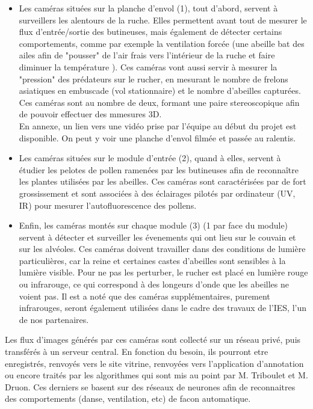 \documentclass[11pt,french,a4paper]{report}
\begin{document}
\begin{itemize}

  \item Les caméras situées sur la planche d'envol (1), tout d'abord, servent à surveillers 
  les alentours de la ruche. Elles permettent avant tout de
  mesurer le flux d'entrée/sortie des butineuses, mais également de détecter
  certains comportements, comme par exemple la ventilation forcée (une abeille
  bat des ailes afin de "pousser" de l'air frais vers l'intérieur de la ruche et faire
  diminuer la température ). Ces caméras vont aussi servir à mesurer la
  "pression" des prédateurs sur le rucher, en mesurant le nombre de frelons
  asiatiques en embuscade (vol stationnaire) et le nombre d'abeilles
  capturées. Ces caméras sont au nombre de deux, formant une paire
  stereoscopique afin de pouvoir effectuer des mmesures 3D. \\
  En annexe, un lien vers une vidéo prise par l'équipe au début du projet est disponible. 
  On peut y voir une planche d'envol filmée et passée au ralentis. \\ 
 
  \item Les caméras situées sur le module d'entrée (2), quand à elles, servent à étudier
  les pelotes de pollen ramenées par les butineuses afin de reconnaître les
  plantes utilisées par les abeilles. Ces caméras sont caractérisées par de
  fort grossissement et sont associées à des éclairages pilotés par ordinateur
  (UV, IR) pour mesurer l'autofluorescence des pollens.

  \item Enfin, les caméras montés sur chaque module (3) (1 par face du module) servent
  à détecter et surveiller les évenements qui ont lieu sur le couvain et sur
  les alvéoles. Ces caméras doivent travailler dans des conditions de lumière
  particulières, car la reine et certaines castes d'abeilles sont sensibles à
  la lumière visible. Pour ne pas les perturber, le rucher est placé en
  lumière rouge ou infrarouge, ce qui correspond à des longeurs d'onde que les
  abeilles ne voient pas. Il est a noté que des caméras supplémentaires,
  purement infrarouges, seront également utilisées dans le cadre des travaux de
  l'IES, l'un de nos partenaires.
\end{itemize}

  Les flux d'images générés par ces caméras sont collecté sur un réseau privé,
  puis transférés à un serveur central. En fonction du besoin, ils pourront
  etre enregistrés, renvoyés vers le site vitrine, renvoyées vers l'application d'annotation
  ou encore traités par les algorithmes qui sont mis au point par M. Triboulet et M. Druon. 
  Ces derniers se basent sur des réseaux de neurones afin de reconnaitres des comportements
  (danse, ventilation, etc) de facon automatique.
\end{document}
